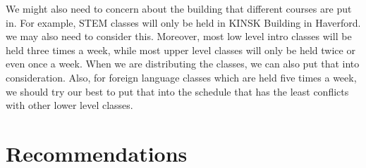 \documentclass[11pt, oneside]{article}   	%
\begin{document}
We might also need to concern about the building that different courses are put in. For example, STEM classes will only be held in KINSK Building in Haverford. we may also need to consider this. Moreover, most low level intro classes will be held three times a week, while most upper level classes will only be held twice or even once a week. When we are distributing the classes, we can also put that into consideration. Also, for foreign language classes which are held five times a week, we should try our best to put that into the schedule that has the least conflicts with other lower level classes. 

\newpage
\section{Recommendations}
\end{document}
